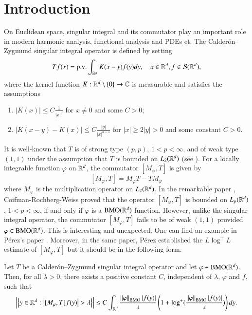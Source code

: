 \documentclass[leqno]{amsart}
\begin{document}
\section{Introduction}
On Euclidean space, singular integral and its commutator play an important role in modern harmonic analysis, functional analysis and PDEs et. The Calder\'{o}n--Zygmund singular integral operator is defined by setting
$$Tf(x)={\rm p.v.} \int_{{\mathbb R}^{d}}K(x-y)f(y)dy,\quad x\in \mathbb{R}^d, f\in\mathcal{S}({\mathbb R}^{d}),$$
where the kernel function $K:{\mathbb R}^{d}\setminus\{0\}\rightarrow{\mathbb C}$ is measurable and satisfies the assumptions
\begin{enumerate}[\rm(1)]
\item $|K(x)|\leq C\frac{1}{|x|^{d}}$ for $x\neq0$ and some $C>0$; 
\item\label{kernel smoothness} $\left|K(x-y)-K(x)\right|\leq C\frac{|y|}{|x|^{d+1}}$ for $|x|\geq2|y|>0$ and some constant $C>0$.
\end{enumerate}
It is well-known that $T$ is of strong type $(p,p)$, $1<p<\infty$, and  of weak type $(1,1)$ under the assumption that $T$ is bounded on $L_{2}({\mathbb R}^{d})$ (see \cite{Gr-book1}).
For a locally integrable function $\varphi$ on ${\mathbb R}^{d}$, the commutator $[M_{\varphi},T]$ is given by $$[M_{\varphi},T]=M_{\varphi}T-TM_{\varphi}$$
where $M_{\varphi}$ is the multiplication operator on $L_{2}({\mathbb R}^{d})$. In the remarkable paper \cite{CRW1976}, Coifman-Rochberg-Weiss proved that the operator $[M_{\varphi},T]$ is bounded on $L_{p}({\mathbb R}^{d})$, $1<p<\infty$, if and only if $\varphi$ is a ${\rm BMO}({\mathbb R}^{d})$ function. However, unlike the singular integral operator, the commutator $[M_{\varphi},T]$ fails to be of weak $(1,1)$ provided $\varphi\in{\rm BMO}({\mathbb R}^{d})$. This is interesting and unexpected. One can find an example in P\'{e}rez's paper \cite[Section 5]{Pe1995}. Moreover, in the same paper, P\'{e}rez established the $L\log^{+}L$ estimate of $[M_{\varphi},T]$ but it should be in the following form. 

\begin{theorem}[{\cite[Theorem 1.1]{Pe1995} }]\label{Perez thm}
	Let $T$ be a Calder\'{o}n--Zygmund singular integral operator and let $\varphi\in{\rm BMO}({\mathbb R}^{d})$. Then, for all $\lambda>0$, there exists a positive constant $C$, independent of $\lambda$, $\varphi$ and $f$, such that
	\begin{align}\label{LlogL correct form}
		\left|\set{y\in\RR^{d}:\left|[M_{\varphi},T]f(y)\right|>\lambda}\right|\leq C\int_{\RR^{d}}\frac{\Norm{\varphi}_{\BMO}|f(y)|}{\lambda}\left(1+\log^{+}(\frac{\Norm{\varphi}_{\BMO}|f(y)|}{\lambda})\right)dy.
	\end{align}
\end{theorem}
\end{document}
